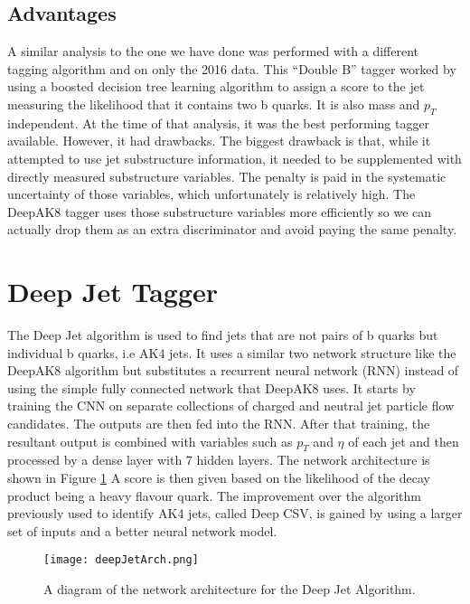 \subsection{Advantages}

A similar analysis to the one we have done was performed with a different tagging algorithm and on only the 2016 data.
This ``Double B'' tagger worked by using a boosted decision tree learning algorithm to assign a score to the jet measuring the likelihood that it contains two b quarks.
It is also mass and $p_T$ independent. At the time of that analysis, it was the best performing tagger available. However, it had drawbacks.
The biggest drawback is that, while it attempted to use jet substructure information, it needed to be supplemented with directly measured substructure variables.
The penalty is paid in the systematic uncertainty of those variables, which unfortunately is relatively high.
The DeepAK8 tagger uses those substructure variables more efficiently so we can actually drop them as an extra discriminator and avoid paying the same penalty.

\section{Deep Jet Tagger}

The Deep Jet algorithm is used to find jets that are not pairs of b quarks but individual b quarks, i.e AK4 jets. 
It uses a similar two network structure like the DeepAK8 algorithm but substitutes a recurrent neural network (RNN) instead of using the simple fully connected network that DeepAK8 uses.
It starts by training the CNN on separate collections of charged and neutral jet particle flow candidates. 
The outputs are then fed into the RNN. After that training, the resultant output is combined with variables such as $p_T$ and $\eta$ of each jet and then processed by a dense layer with 7 hidden layers.
The network architecture is shown in Figure \ref{fig:fig_4-4}
A score is then given based on the likelihood of the decay product being a heavy flavour quark. The improvement over the algorithm previously used to identify AK4 jets, called Deep CSV, is gained by using a larger set of inputs and a better neural network model.
\begin{figure} %
    \centering
    \texttt{[image: deepJetArch.png]}
    \caption{A diagram of the network architecture for the Deep Jet Algorithm.}
    \label{fig:fig_4-4}
 \end{figure}
